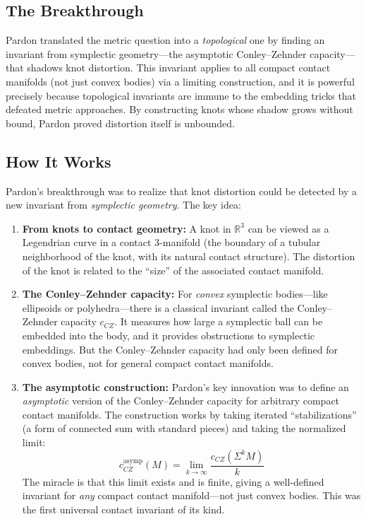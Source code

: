 \subsection{The Breakthrough}

Pardon translated the metric question into a \emph{topological} one by finding an invariant from symplectic geometry---the asymptotic Conley--Zehnder capacity---that shadows knot distortion. This invariant applies to all compact contact manifolds (not just convex bodies) via a limiting construction, and it is powerful precisely because topological invariants are immune to the embedding tricks that defeated metric approaches. By constructing knots whose shadow grows without bound, Pardon proved distortion itself is unbounded.

\subsection{How It Works}

Pardon's breakthrough was to realize that knot distortion could be detected by a new invariant from \emph{symplectic geometry}. The key idea:

\begin{enumerate}
\item \textbf{From knots to contact geometry:} A knot in $\mathbb{R}^3$ can be viewed as a Legendrian curve in a contact 3-manifold (the boundary of a tubular neighborhood of the knot, with its natural contact structure). The distortion of the knot is related to the ``size'' of the associated contact manifold.

\item \textbf{The Conley--Zehnder capacity:} For \emph{convex} symplectic bodies---like ellipsoids or polyhedra---there is a classical invariant called the Conley--Zehnder capacity $c_{CZ}$. It measures how large a symplectic ball can be embedded into the body, and it provides obstructions to symplectic embeddings. But the Conley--Zehnder capacity had only been defined for convex bodies, not for general compact contact manifolds.

\item \textbf{The asymptotic construction:} Pardon's key innovation was to define an \emph{asymptotic} version of the Conley--Zehnder capacity for arbitrary compact contact manifolds. The construction works by taking iterated ``stabilizations'' (a form of connected sum with standard pieces) and taking the normalized limit:
\[
c_{CZ}^{\text{asymp}}(M) = \lim_{k \to \infty} \frac{c_{CZ}(\Sigma^k M)}{k}
\]
The miracle is that this limit exists and is finite, giving a well-defined invariant for \emph{any} compact contact manifold---not just convex bodies. This was the first universal contact invariant of its kind.
\end{enumerate}

